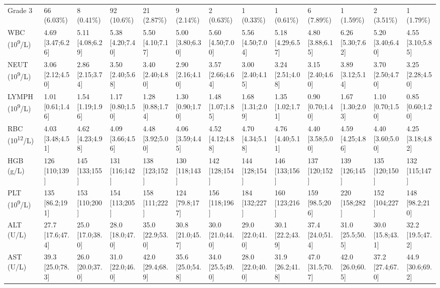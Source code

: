 \documentclass{article}
\begin{document}
\begin{landscape}
\begin{tiny}
\begin{tabularx}{\linewidth}{p{2.0cm}|X|X|X|X|X|X|X|X|X|X|X|X}
\rowcolor{gray!10}
    Grade 3 &    66 (6.03\%)    &    8 (0.41\%)     &    92 (10.6\%)    &    21 (2.87\%)    &    9 (2.14\%)     &    2 (0.63\%)     &    1 (0.33\%)     &    1 (0.61\%)     &    6 (7.89\%)     &    1 (1.59\%)     &    2 (3.51\%)     &    1 (1.79\%)     \\
\rowcolor{gray!10}
WBC (10\textsuperscript{9}/L) & 4.69 [3.47;6.26] & 5.11 [4.08;6.29] & 5.38 [4.20;7.40] & 5.50 [4.10;7.17] & 5.00 [3.80;6.30] & 5.60 [4.50;7.00] & 5.56 [4.50;7.04] & 5.18 [4.29;6.57] & 4.80 [3.88;6.15] & 6.26 [5.30;7.62] & 5.20 [3.40;6.40] & 4.55 [3.10;5.85] \\
\rowcolor{gray!10}
NEUT (10\textsuperscript{9}/L) & 3.06 [2.12;4.50] & 2.86 [2.15;3.74] & 3.50 [2.40;5.68] & 3.40 [2.40;4.80] & 2.90 [2.16;4.10] & 3.57 [2.66;4.64] & 3.00 [2.40;4.15] & 3.24 [2.51;4.08] & 3.15 [2.40;4.60] & 3.89 [3.12;5.14] & 3.70 [2.50;4.70] & 3.25 [2.28;4.50] \\
\rowcolor{gray!10}
LYMPH (10\textsuperscript{9}/L) & 1.01 [0.61;1.46] & 1.54 [1.19;1.96] & 1.17 [0.80;1.50] & 1.28 [0.88;1.74] & 1.30 [0.90;1.70] & 1.48 [1.07;1.85] & 1.68 [1.31;2.09] & 1.35 [1.02;1.71] & 0.90 [0.70;1.40] & 1.67 [1.30;2.03] & 1.10 [0.70;1.50] & 0.85 [0.60;1.20] \\
\rowcolor{gray!10}
RBC (10\textsuperscript{12}/L) & 4.03 [3.48;4.51] & 4.62 [4.23;4.98] & 4.09 [3.66;4.56] & 4.48 [3.92;5.00] & 4.06 [3.59;4.45] & 4.52 [4.12;4.88] & 4.70 [4.34;5.18] & 4.76 [4.40;5.11] & 4.40 [3.58;5.00] & 4.59 [4.25;4.86] & 4.40 [3.60;5.00] & 4.25 [3.18;4.82] \\
\rowcolor{gray!10}
HGB (g/L) &  126 [110;139]   &  145 [133;155]   &  131 [116;142]   &  138 [123;152]   &  130 [118;143]   &  142 [128;154]   &  144 [128;154]   &  146 [133;156]   &  137 [120;152]   &  139 [126;145]   &  135 [120;150]   &  132 [115;147]   \\
\rowcolor{gray!10}
PLT (10\textsuperscript{9}/L) &  135 [86.2;191]  &  153 [110;200]   &  154 [113;205]   &  158 [111;222]   &  124 [79.8;177]  &  156 [118;196]   &  184 [132;227]   &  160 [123;216]   &  159 [98.5;206]  &  220 [158;282]   &  152 [104;227]   &  148 [98.2;210]  \\
\rowcolor{gray!10}
ALT (U/L) & 27.7 [17.6;47.4] & 25.0 [17.0;38.0] & 28.0 [18.0;47.0] & 35.0 [22.9;53.0] & 30.8 [21.0;45.7] & 30.0 [21.0;44.0] & 29.0 [22.0;41.0] & 30.1 [22.2;43.9] & 37.4 [24.0;51.4] & 31.0 [25.5;50.5] & 30.0 [15.8;43.1] & 32.2 [19.5;47.2] \\
\rowcolor{gray!10}
AST (U/L) & 39.3 [25.0;78.3] & 26.0 [20.0;37.0] & 31.0 [22.0;46.0] & 42.0 [29.4;68.9] & 35.6 [25.0;54.8] & 34.0 [25.5;49.0] & 28.0 [22.0;40.0] & 31.9 [26.2;41.8] & 47.0 [31.5;70.7] & 42.0 [26.0;60.5] & 37.2 [27.4;67.0] & 44.9 [30.6;69.2] \\

\end{tabularx}
\end{tiny}
\end{landscape}
\end{document}
